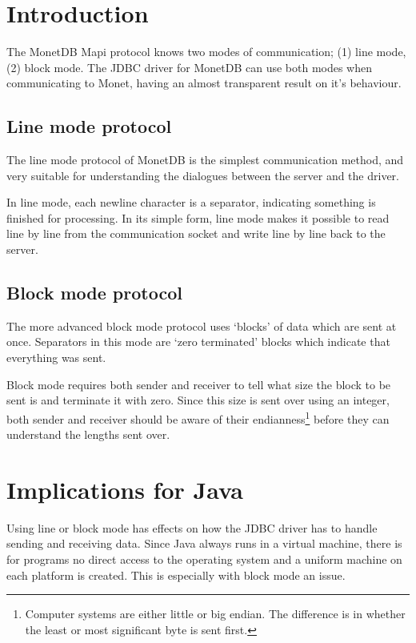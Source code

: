 \documentclass{article}
\begin{document}
\section{Introduction}

The MonetDB Mapi protocol knows two modes of communication;
(1) line mode, (2) block mode. The JDBC driver for MonetDB can
use both modes when communicating to Monet, having an almost
transparent result on it's behaviour.


\subsection{Line mode protocol}

The line mode protocol of MonetDB is the simplest communication
method, and very suitable for understanding the dialogues between
the server and the driver.

In line mode, each newline character is a separator, indicating
something is finished for processing. In its simple form, line mode
makes it possible to read line by line from the communication socket
and write line by line back to the server.


\subsection{Block mode protocol}

The more advanced block mode protocol uses `blocks' of data which
are sent at once. Separators in this mode are `zero terminated' blocks
which indicate that everything was sent.

Block mode requires both sender and receiver to tell what size the
block to be sent is and terminate it with zero. Since this size is sent
over using an integer, both sender and receiver should be aware of
their endianness\footnote{Computer systems are either little or big
endian. The difference is in whether the least or most significant byte
is sent first.} before they can understand the lengths sent over.


\section{Implications for Java}

Using line or block mode has effects on how the JDBC driver has to
handle sending and receiving data. Since Java always runs in a
virtual machine, there is for programs no direct access to the
operating system and a uniform machine on each platform is created.
This is especially with block mode an issue.
\end{document}

